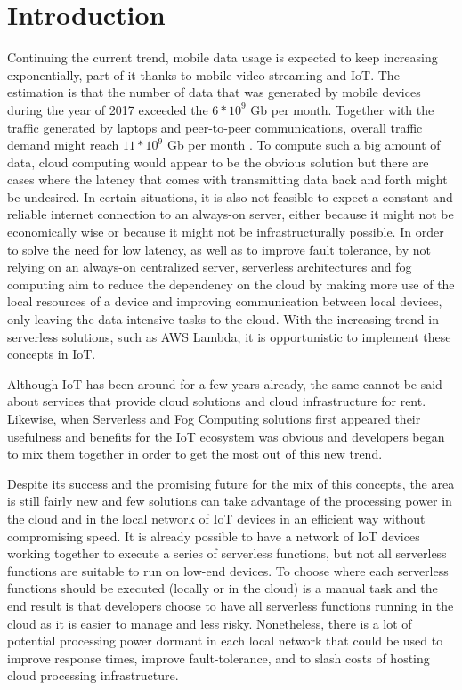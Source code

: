 \section{Introduction}
Continuing the current trend, mobile data usage is expected to keep increasing
exponentially, part of it thanks to mobile video streaming and
IoT. The estimation is that the number of data that was generated
by mobile devices during the year of 2017 exceeded the $\displaystyle 6 * 10^9$ Gb
per month. Together with the traffic generated by laptops and peer-to-peer
communications, overall traffic demand might reach $\displaystyle 11 * 10^9$ Gb per
month\cite{kn:Dehos2014} \cite{kn:Baresi2017}. To compute such a big amount of
data, cloud computing would appear to be the obvious solution but there are cases
where the latency that comes with transmitting data back and forth might be
undesired. In certain situations, it is also not feasible to expect a constant and
reliable internet connection to an always-on server, either because it might not
be economically wise or because it might not be infrastructurally possible. In
order to solve the need for low latency, as well as to improve fault tolerance, by
not relying on an always-on centralized server, serverless architectures and fog
computing aim to reduce the dependency on the cloud by making more use of the
local resources of a device and improving communication between local devices,
only leaving the data-intensive tasks to the cloud\cite{kn:Baresi2017}. With the
increasing trend in serverless solutions, such as AWS Lambda, it is opportunistic
to implement these concepts in IoT.

Although IoT has been around for a few years already, the same cannot be said
about services that provide cloud solutions and cloud infrastructure for rent. 
Likewise, when Serverless and Fog Computing solutions first appeared their
usefulness and benefits for the IoT ecosystem was obvious and developers began to
mix them together in order to get the most out of this new trend.

Despite its success and the promising future for the mix of this concepts, the
area is still fairly new and few solutions can take advantage of the processing
power in the cloud and in the local network of IoT devices in an efficient way
without compromising speed. It is already possible to have a network of IoT
devices working together to execute a series of serverless functions, but not all
serverless functions are suitable to run on low-end devices. To choose where each
serverless functions should be executed (locally or in the cloud) is a manual task
and the end result is that developers choose to have all serverless functions
running in the cloud as it is easier to manage and less risky. Nonetheless, there
is a lot of potential processing power dormant in each local network that could
be used to improve response times, improve fault-tolerance,  and to slash costs of
hosting cloud processing infrastructure. 
